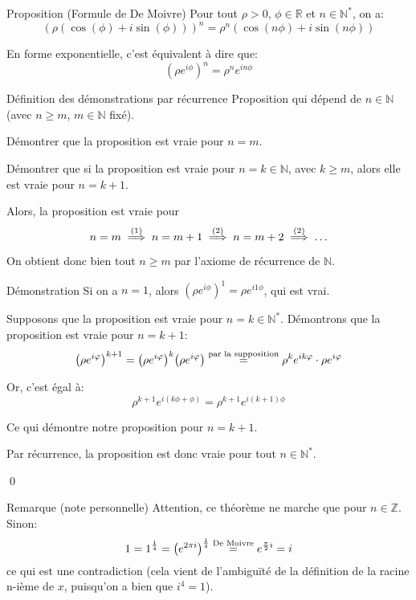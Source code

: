 \documentclass{article}
\begin{document}
\begin{parag}{Proposition (Formule de De Moivre)}
    Pour tout $\rho > 0$, $\phi \in \mathbb{R}$ et $n \in \mathbb{N}^*$, on a:
    \[\left(\rho\left(\cos\left(\phi\right) + i\sin\left(\phi\right)\right)\right)^n = \rho^n \left(\cos\left(n \phi\right) + i\sin\left(n \phi\right)\right)\]

   En forme exponentielle, c'est équivalent à dire que:
   \[\left(\rho e^{i \phi}\right)^n = \rho^n e^{in\phi}\]

    \begin{subparag}{Définition des démonstrations par récurrence}
        Proposition qui dépend de $n \in \mathbb{N}$ (avec $n \geq m$, $m \in \mathbb{N}$ fixé).

        Démontrer que la proposition est vraie pour $n = m$.

        Démontrer que si la proposition est vraie pour $n = k \in \mathbb{N}$, avec $k \geq m$, alors elle est vraie pour $n = k + 1$.

       Alors, la proposition est vraie pour
       \[n = m \over{\implies}{\text{(1)}}  n = m + 1 \over{\implies}{\text{(2)}}  n = m + 2 \over{\implies}{\text{(2)}}  \ldots\]

       On obtient donc bien tout $n \geq m$ par l'axiome de récurrence de $\mathbb{N}$.
    \end{subparag}

    \begin{subparag}{Démonstration}
         Si on a $n = 1$, alors $\left(\rho e^{i\phi}\right)^1 = \rho e^{i1\phi}$, qui est vrai.

         Supposons que la proposition est vraie pour $n = k \in \mathbb{N}^*$. Démontrons que la proposition est vraie pour $n = k + 1$:
        \[\left(\rho e^{i\phi}\right)^{k+1} = \left(\rho e^{i\phi}\right)^k \left(\rho e^{i\phi}\right) \over{=}{\text{par la supposition}} \rho^k e^{ik\phi} \cdot \rho e^{i\phi}\]

        Or, c'est égal à:
        \[\rho^{k+1} e^{i\left(k\phi + \phi\right)} = \rho^{k+1} e^{i\left(k+1\right)\phi}\]

        Ce qui démontre notre proposition pour $n = k+1$.

        Par récurrence, la proposition est donc vraie pour tout $n \in \mathbb{N}^*$.

        \qed
    \end{subparag}


    \begin{subparag}{Remarque (note personnelle)}
       Attention, ce théorème ne marche que pour $n \in \mathbb{Z}$. Sinon:
       \[1 = 1^{\frac{1}{4}} = \left(e^{2\pi i}\right)^{\frac{1}{4}} \over{=}{De Moivre} e^{\frac{\pi}{2}i} = i\]
       ce qui est une contradiction (cela vient de l'ambiguïté de la définition de la racine n-ième de $x$, puisqu'on a bien que $i^{4} = 1$).
    \end{subparag}

\end{parag}
\end{document}
